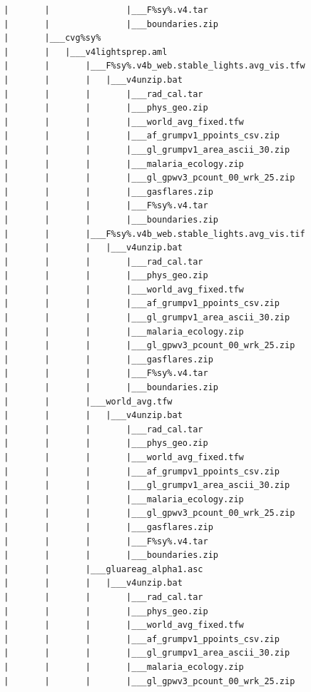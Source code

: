 \documentclass[]{book}
\begin{document}
\begin{verbatim}
        |       |               |___F%sy%.v4.tar
        |       |               |___boundaries.zip
        |       |___cvg%sy%
        |       |   |___v4lightsprep.aml
        |       |       |___F%sy%.v4b_web.stable_lights.avg_vis.tfw
        |       |       |   |___v4unzip.bat
        |       |       |       |___rad_cal.tar
        |       |       |       |___phys_geo.zip
        |       |       |       |___world_avg_fixed.tfw
        |       |       |       |___af_grumpv1_ppoints_csv.zip
        |       |       |       |___gl_grumpv1_area_ascii_30.zip
        |       |       |       |___malaria_ecology.zip
        |       |       |       |___gl_gpwv3_pcount_00_wrk_25.zip
        |       |       |       |___gasflares.zip
        |       |       |       |___F%sy%.v4.tar
        |       |       |       |___boundaries.zip
        |       |       |___F%sy%.v4b_web.stable_lights.avg_vis.tif
        |       |       |   |___v4unzip.bat
        |       |       |       |___rad_cal.tar
        |       |       |       |___phys_geo.zip
        |       |       |       |___world_avg_fixed.tfw
        |       |       |       |___af_grumpv1_ppoints_csv.zip
        |       |       |       |___gl_grumpv1_area_ascii_30.zip
        |       |       |       |___malaria_ecology.zip
        |       |       |       |___gl_gpwv3_pcount_00_wrk_25.zip
        |       |       |       |___gasflares.zip
        |       |       |       |___F%sy%.v4.tar
        |       |       |       |___boundaries.zip
        |       |       |___world_avg.tfw
        |       |       |   |___v4unzip.bat
        |       |       |       |___rad_cal.tar
        |       |       |       |___phys_geo.zip
        |       |       |       |___world_avg_fixed.tfw
        |       |       |       |___af_grumpv1_ppoints_csv.zip
        |       |       |       |___gl_grumpv1_area_ascii_30.zip
        |       |       |       |___malaria_ecology.zip
        |       |       |       |___gl_gpwv3_pcount_00_wrk_25.zip
        |       |       |       |___gasflares.zip
        |       |       |       |___F%sy%.v4.tar
        |       |       |       |___boundaries.zip
        |       |       |___gluareag_alpha1.asc
        |       |       |   |___v4unzip.bat
        |       |       |       |___rad_cal.tar
        |       |       |       |___phys_geo.zip
        |       |       |       |___world_avg_fixed.tfw
        |       |       |       |___af_grumpv1_ppoints_csv.zip
        |       |       |       |___gl_grumpv1_area_ascii_30.zip
        |       |       |       |___malaria_ecology.zip
        |       |       |       |___gl_gpwv3_pcount_00_wrk_25.zip

\end{verbatim}
\end{document}

